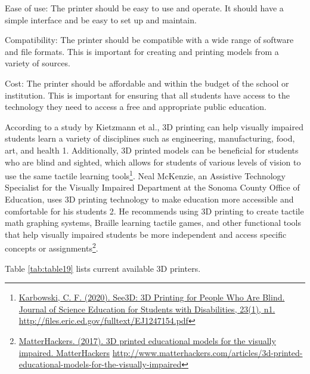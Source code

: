 \documentclass[12pt,letterpaper,twoside,openright]{report}
\begin{document}
Ease of use: The printer should be easy to use and operate. It should have a simple interface and be easy to set up and maintain.

Compatibility: The printer should be compatible with a wide range of software and file formats. This is important for creating and printing models from a variety of sources.

Cost: The printer should be affordable and within the budget of the school or institution. This is important for ensuring that all students have access to the technology they need to access a free and appropriate public education.

According to a study by Kietzmann et al., 3D printing can help visually impaired students learn a variety of disciplines such as engineering, manufacturing, food, art, and health 1. Additionally, 3D printed models can be beneficial for students who are blind and sighted, which allows for students of various levels of vision to use the same tactile learning tools\footnote{\raggedright \href{http://files.eric.ed.gov/fulltext/EJ1247154.pdf}{Karbowski, C. F. (2020). See3D: 3D Printing for People Who Are Blind. Journal of Science Education for Students with Disabilities, 23(1), n1.} \url{http://files.eric.ed.gov/fulltext/EJ1247154.pdf}}. Neal McKenzie, an Assistive Technology Specialist for the Visually Impaired Department at the Sonoma County Office of Education, uses 3D printing technology to make education more accessible and comfortable for his students 2. He recommends using 3D printing to create tactile math graphing systems, Braille learning tactile games, and other functional tools that help visually impaired students be more independent and access specific concepts or assignments\footnote{\raggedright \raggedright\href{http://www.matterhackers.com/articles/3d-printed-educational-models-for-the-visually-impaired}{MatterHackers. (2017). 3D printed educational models for the visually impaired. MatterHackers} \hfill\break\url{http://www.matterhackers.com/articles/3d-printed-educational-models-for-the-visually-impaired}}. 

Table \ref{tab:table19} lists current available 3D printers.
\end{document}
